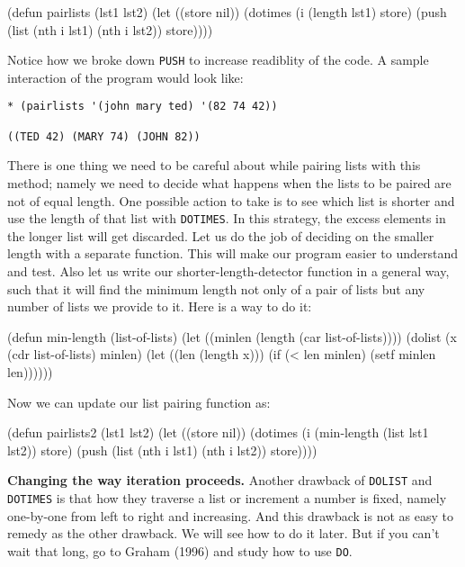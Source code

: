 \documentclass[a4paper,11pt]{article}
\begin{document}
\begin{uenum}
\begin{uenumi}
\begin{lispcode}
(defun pairlists (lst1 lst2)
  (let ((store nil))
	(dotimes (i (length lst1)  store)
	  (push 
		(list (nth i lst1) (nth i lst2))
		store))))
\end{lispcode}

Notice how we broke down \Verb+PUSH+ to increase readiblity of the code.  A sample interaction of the program would look like:

\begin{ucodeframe}
\begin{Verbatim}
* (pairlists '(john mary ted) '(82 74 42))

((TED 42) (MARY 74) (JOHN 82))
\end{Verbatim}
\end{ucodeframe}

\item There is one thing we need to be careful about while pairing lists with this method; namely we need to decide what happens when the lists to be paired are not of equal length. One possible action to take is to see which list is shorter and use the length of that list with \Verb+DOTIMES+. In this strategy, the excess elements in the longer list will get discarded. Let us do the job of deciding on the smaller length with a separate function. This will make our program easier to understand and test. Also let us write our shorter-length-detector function in a general way, such that it will find the minimum length not only of a pair of lists but any number of lists we provide to it. Here is a way to do it: 

\begin{lispcode}
(defun min-length (list-of-lists)
  (let ((minlen (length (car list-of-lists))))
	(dolist (x (cdr list-of-lists) minlen)
	  (let ((len (length x)))
		(if (< len minlen)
		  (setf minlen len))))))
\end{lispcode}


\item Now we can update our list pairing function as:

\begin{lispcode}
(defun pairlists2 (lst1 lst2)
  (let ((store nil))
	(dotimes (i (min-length (list lst1 lst2)) store)
	  (push 
		(list (nth i lst1) (nth i lst2))
		store))))

\end{lispcode}
\end{uenumi}

\item {\bf Changing the way iteration proceeds.} Another drawback of \Verb+DOLIST+ and \Verb+DOTIMES+ is that how they traverse a list or increment a number is fixed, namely one-by-one from left to right and increasing. And this drawback is not as easy to remedy as the other drawback. We will see how to do it later. But if you can't wait that long, go to Graham (1996) and study how to use \Verb+DO+.


\end{uenum}
\end{document}
